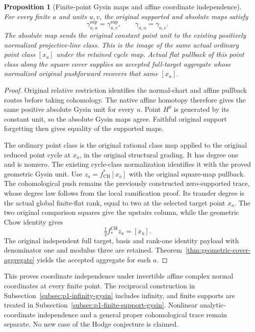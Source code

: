 \documentclass[11pt]{article}
\newtheorem{proposition}[theorem]{Proposition}
\theoremstyle{definition}
\theoremstyle{remark}
\DeclareMathOperator{\CH}{CH}
\begin{document}
\begin{proposition}[Finite-point Gysin maps and affine coordinate independence]
\label{prop:p1-finite-point-gysin}
For every finite \(a\) and units \(u,v\), the original supported and
absolute maps satisfy
\[
 \gamma^{\mathrm{sup}}_{a,u}=\gamma^{\mathrm{sup}}_{a,v},
 \qquad \gamma_{a,u}=\gamma_{a,v}.
\]
The absolute map sends the original constant point unit to the
existing positively normalized projective-line class. This is the image of the
same actual ordinary point class \([x_a]\) under the retained cycle
map. Actual flat pullback of this point class along the square cover
supplies an accepted full-target aggregate whose normalized original
pushforward recovers that same \([x_a]\).
\end{proposition}
\begin{proof}
Original relative restriction identifies the normal-chart and affine
pullback routes before taking cohomology. The native affine homotopy
therefore gives the same positive absolute Gysin unit for every
\(u\). Point \(H^0\) is generated by its constant unit, so the
absolute Gysin maps agree. Faithful original support forgetting then
gives equality of the supported maps.

The ordinary point class is the original rational class map applied
to the original reduced point cycle at \(x_a\), in the original
structural grading. It has degree one and is nonzero. The existing
cycle-class normalization identifies it with the proved geometric
Gysin unit. Use \(z_a=f_{\CH}^*[x_a]\) with the original square-map
pullback. The cohomological push remains the previously constructed
zero-supported trace, whose degree law follows from the local
ramification proof. Its transfer degree is the actual global
finite-flat rank, equal to two at the selected target point \(x_a\).
The two original comparison squares give the upstairs column, while
the geometric Chow identity gives
\[
 \tfrac12 f_*^{\CH}z_a=[x_a].
\]
The original independent full target, basis and rank-one identity
payload with denominator one and modulus three are retained.
Theorem~\ref{thm:geometric-cover-aggregate} yields the accepted
aggregate for each \(a\).
\end{proof}

This proves coordinate independence under invertible affine complex
normal coordinates at every finite point. The reciprocal construction
in Subsection~\ref{subsec:p1-infinity-gysin} includes infinity, and finite
supports are treated in Subsection~\ref{subsec:p1-finite-support-gysin}.
Nonlinear analytic-coordinate independence and a general proper
cohomological trace remain separate. No new case of the Hodge conjecture
is claimed.
\end{document}

